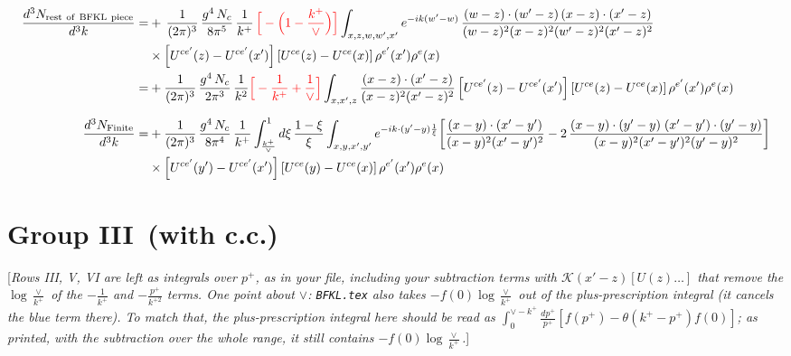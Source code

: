 \documentclass[9pt]{article}
\numberwithin{equation}{section}
\newcommand{\chg}[1]{{\color{red}#1}}
\newcommand{\rnote}[1]{{\color{teal}[\textit{#1}]}}
\begin{document}
\begin{align}
\frac{d^{3}N_{\rm rest\ of\ BFKL\ piece}}{d^{3}k}= &    +\,\frac{1}{(2\pi)^{3}}\,\frac{g^{4}\,N_{c}}{8\pi^{5}}\,\frac{1}{k^{+}}\,\chg{\Big[-\Big(1-\frac{k^{+}}{\vee}\Big)\Big]}\int_{x,z,w,w',x'}e^{-ik(w'-w)}\,\frac{(w-z)\cdot (w'-z)\,(x-z)\cdot (x'-z)}{(w-z)^{2}(x-z)^{2}(w'-z)^{2}(x'-z)^{2}}\notag\\
&\times\left[U^{ce'}(z) - U^{ce'}(x')\right]\left[U^{ce}(z) - U^{ce}(x)\right]\rho^{e'}(x') \rho^{e}(x)\notag \\
= & +\frac{1}{(2\pi)^{3}}\,\frac{g^{4}\,N_{c}}{2\pi^{3}}\,\frac{1}{k^{2}}\chg{\Big[-\frac{1}{k^{+}}+\frac{1}{\vee}\Big]}\int_{x,x',z}\frac{(x-z)\cdot(x'-z)}{(x-z)^{2}(x'-z)^{2}}\left[U^{ce'}(z) - U^{ce'}(x')\right]\left[U^{ce}(z) - U^{ce}(x)\right]\rho^{e'}(x')\rho^{e}(x)\\[6pt]
\frac{d^{3}N_{\rm Finite}}{d^{3}k}= &  +\frac{1}{(2\pi)^{3}}\,\frac{g^{4}\,N_{c}}{8\pi^{4}}\,\frac{1}{k^{+}}\int_{\frac{k^{+}}{\vee}}^{1}d\xi\,\frac{1-\xi}{\xi}\int_{x,y,x',y'}e^{-ik\cdot(y'-y)\frac{1}{\xi}}\bigg[\frac{(x-y)\cdot(x'-y')}{(x-y)^{2}(x'-y')^{2}}-2\,\frac{(x-y)\cdot(y'-y)\;(x'-y')\cdot(y'-y)}{(x-y)^{2}(x'-y')^{2}(y'-y)^{2}}\bigg]\notag\\
&\times\left[U^{ce'}(y') - U^{ce'}(x')\right]\left[U^{ce}(y) - U^{ce}(x)\right]\rho^{e'}(x')\rho^{e}(x)
\end{align}
\section{Group III\, (with c.c.)}
\rnote{Rows III, V, VI are left as integrals over $p^{+}$, as in your file, including your subtraction terms with $\mathcal{K}(x'-z)[U(z)\ldots]$ that remove the $\log\frac{\vee}{k^{+}}$ of the $-\frac{1}{k^{+}}$ and $-\frac{p^{+}}{k^{+2}}$ terms. One point about $\vee$: \texttt{BFKL.tex} also takes $-f(0)\log\frac{\vee}{k^{+}}$ out of the plus-prescription integral (it cancels the blue term there). To match that, the plus-prescription integral here should be read as $\int_{0}^{\vee-k^{+}}\frac{dp^{+}}{p^{+}}[f(p^{+})-\theta(k^{+}-p^{+})f(0)]$; as printed, with the subtraction over the whole range, it still contains $-f(0)\log\frac{\vee}{k^{+}}$.}
\end{document}

